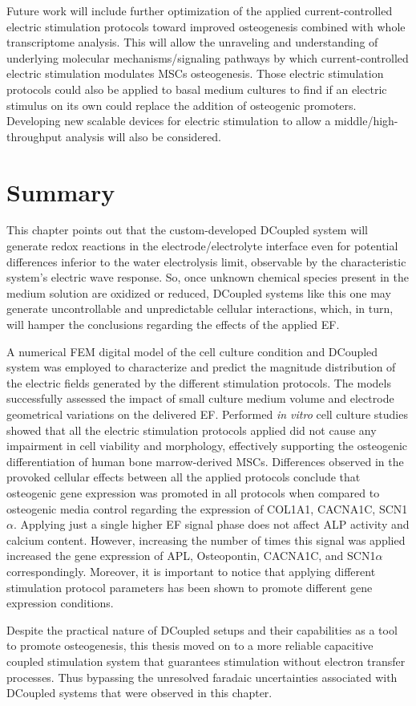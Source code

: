Future work will include further optimization of the applied current-controlled electric stimulation protocols toward improved osteogenesis combined with whole transcriptome analysis. This will allow the unraveling and understanding of underlying molecular mechanisms/signaling pathways by which current-controlled electric stimulation modulates \ac{MSCs} osteogenesis. Those electric stimulation protocols could also be applied to basal medium cultures to find if an electric stimulus on its own could replace the addition of osteogenic promoters. Developing new scalable devices for electric stimulation to allow a middle/high-throughput analysis will also be considered.


\section{Summary}

This chapter points out that the custom-developed \acs{DCoupled} system will generate redox reactions in the electrode/electrolyte interface even for potential differences inferior to the water electrolysis limit, observable by the characteristic system's electric wave response. So, once unknown chemical species present in the medium solution are oxidized or reduced, \acs{DCoupled} systems like this one may generate uncontrollable and unpredictable cellular interactions, which, in turn, will hamper the conclusions regarding the effects of the applied \acs{EF}. 

A numerical \acs{FEM} digital model of the cell culture condition and \acs{DCoupled} system was employed to characterize and predict the magnitude distribution of the electric fields generated by the different stimulation protocols. The models successfully assessed the impact of small culture medium volume and electrode geometrical variations on the delivered \acs{EF}. Performed \textit{in vitro} cell culture studies showed that all the electric stimulation protocols applied did not cause any impairment in cell viability and morphology, effectively supporting the osteogenic differentiation of human bone marrow-derived \ac{MSCs}. Differences observed in the provoked cellular effects between all the applied protocols conclude that osteogenic gene expression was promoted in all protocols when compared to osteogenic media control regarding the expression of COL1A1, CACNA1C, SCN1$\alpha$. Applying just a single higher \acs{EF} signal phase does not affect ALP activity and calcium content. However, increasing the number of times this signal was applied increased the gene expression of APL, Osteopontin, CACNA1C, and SCN1$\alpha$ correspondingly. Moreover, it is important to notice that applying different stimulation protocol parameters has been shown to promote different gene expression conditions.  

Despite the practical nature of \acs{DCoupled} setups and their capabilities as a tool to promote osteogenesis, this thesis moved on to a more reliable capacitive coupled stimulation system that guarantees stimulation without electron transfer processes. Thus bypassing the unresolved faradaic uncertainties associated with \acs{DCoupled} systems that were observed in this chapter.


% 
%
%